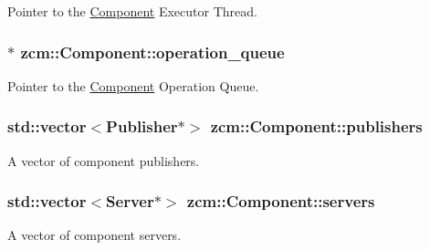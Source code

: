 Pointer to the \hyperlink{classzcm_1_1Component}{Component} Executor Thread. 

\subsubsection[{\texorpdfstring{operation\+\_\+queue}{operation_queue}}]{$\ast$ zcm\+::\+Component\+::operation\+\_\+queue\hspace{0.3cm}{\ttfamily [protected]}}\hypertarget{classzcm_1_1Component_a4c9f3591c18dde89bc3c2af7717c6692}{}\label{classzcm_1_1Component_a4c9f3591c18dde89bc3c2af7717c6692}


Pointer to the \hyperlink{classzcm_1_1Component}{Component} Operation Queue. 

\subsubsection[{\texorpdfstring{publishers}{publishers}}]{\setlength{\rightskip}{0pt plus 5cm}std\+::vector$<${\bf Publisher}$\ast$$>$ zcm\+::\+Component\+::publishers\hspace{0.3cm}{\ttfamily [protected]}}\hypertarget{classzcm_1_1Component_a4dcce63b0b5495bc15bd18e5dce86094}{}\label{classzcm_1_1Component_a4dcce63b0b5495bc15bd18e5dce86094}


A vector of component publishers. 

\subsubsection[{\texorpdfstring{servers}{servers}}]{\setlength{\rightskip}{0pt plus 5cm}std\+::vector$<${\bf Server}$\ast$$>$ zcm\+::\+Component\+::servers\hspace{0.3cm}{\ttfamily [protected]}}\hypertarget{classzcm_1_1Component_a1d99508f165f7014b190d2fbe4ad2271}{}\label{classzcm_1_1Component_a1d99508f165f7014b190d2fbe4ad2271}


A vector of component servers. 


